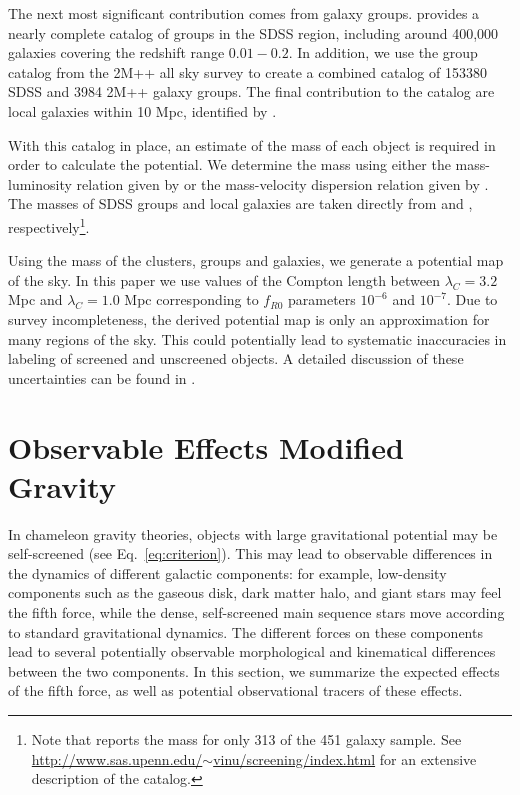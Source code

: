 \documentclass[useAMS,usenatbib,twocolumn]{mn2e}
\begin{document}
The next most significant contribution comes from galaxy groups.
\citet{yan07} provides a nearly complete catalog of groups in the SDSS region,
including around 400,000 galaxies
covering the redshift range $0.01-0.2$.
In addition, we use the group catalog from the 2M++ all
sky survey \citep{lav011} to create a combined catalog of
153380 SDSS and 3984 2M++ galaxy groups.
The final contribution to the catalog are
local galaxies within 10 Mpc, identified by \citet{kar04}. 

With this catalog in place, an estimate of the mass of each object
is required in order to calculate the potential.
We determine the mass using either the mass-luminosity relation given by
\citet{rei02} or the mass-velocity dispersion relation given by \citet{evr08}.
The masses of SDSS groups and local galaxies are taken directly from
\citet{yan07} and \citet{kar04}, respectively\footnote{Note
that \citet{kar04} reports the mass for only 313 of the 451 galaxy sample.
See \href{http://www.sas.upenn.edu/~vinu/screening/index.html}{
http://www.sas.upenn.edu/$\sim$vinu/screening/index.html} for an extensive
description of the catalog.}.

Using the mass of the clusters, groups and galaxies, we generate a
potential map of the sky.
In this paper we use values of the Compton length between $\lambda_C
= 3.2$ Mpc and  $\lambda_C = 1.0$ Mpc corresponding to $f_{R0}$ parameters
$10^{-6}$ and $10^{-7}$.  
Due to survey incompleteness, the derived potential map
is only an approximation for many regions of the sky. This could potentially
lead to systematic inaccuracies in labeling of screened and unscreened objects.
A detailed discussion of these uncertainties can be found in \citet{cabre2012}. 
 
\section{Observable Effects Modified Gravity}
\label{sec:test-summary}

In chameleon gravity theories, objects with large gravitational potential
may be self-screened (see Eq.~\ref{eq:criterion}).  This may lead to observable
differences in the dynamics of different galactic components: for example,
low-density components such as the gaseous disk, dark matter halo, and giant
stars may feel the fifth force, while the dense, self-screened main sequence
stars move according to standard gravitational dynamics.
The different forces on these components lead to several potentially observable
morphological and kinematical differences between the two components. In
this section, we summarize the expected effects of the fifth force, as well
as potential observational tracers of these effects.
\end{document}

